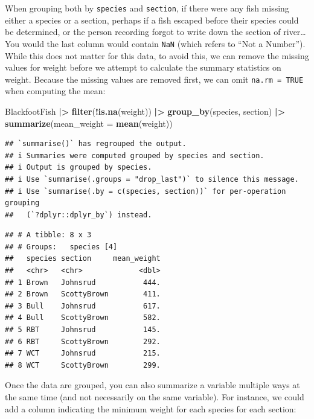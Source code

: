 \documentclass[
  10pt,
  letterpaper,
  twoside,
  openright]{book}
\newenvironment{Shaded}{\begin{snugshade}}{\end{snugshade}}
\newcommand{\AttributeTok}[1]{\textcolor[rgb]{0.13,0.29,0.53}{#1}}
\newcommand{\FunctionTok}[1]{\textcolor[rgb]{0.13,0.29,0.53}{\textbf{#1}}}
\newcommand{\NormalTok}[1]{#1}
\newcommand{\SpecialCharTok}[1]{\textcolor[rgb]{0.81,0.36,0.00}{\textbf{#1}}}
\begin{document}
When grouping both by \texttt{species} and \texttt{section}, if there
were any fish missing either a species or a section, perhaps if a fish
escaped before their species could be determined, or the person
recording forgot to write down the section of river\ldots{} You would
the last column would contain \texttt{NaN} (which refers to ``Not a
Number''). While this does not matter for this data, to avoid this, we
can remove the missing values for weight before we attempt to calculate
the summary statistics on weight. Because the missing values are removed
first, we can omit \texttt{na.rm\ =\ TRUE} when computing the mean:

\begin{Shaded}
\begin{Highlighting}[]
\NormalTok{BlackfootFish }\SpecialCharTok{|\textgreater{}}
  \FunctionTok{filter}\NormalTok{(}\SpecialCharTok{!}\FunctionTok{is.na}\NormalTok{(weight)) }\SpecialCharTok{|\textgreater{}}
  \FunctionTok{group\_by}\NormalTok{(species, section) }\SpecialCharTok{|\textgreater{}}
  \FunctionTok{summarize}\NormalTok{(}\AttributeTok{mean\_weight =} \FunctionTok{mean}\NormalTok{(weight))}
\end{Highlighting}
\end{Shaded}

\begin{verbatim}
## `summarise()` has regrouped the output.
## i Summaries were computed grouped by species and section.
## i Output is grouped by species.
## i Use `summarise(.groups = "drop_last")` to silence this message.
## i Use `summarise(.by = c(species, section))` for per-operation grouping
##   (`?dplyr::dplyr_by`) instead.
\end{verbatim}

\begin{verbatim}
## # A tibble: 8 x 3
## # Groups:   species [4]
##   species section     mean_weight
##   <chr>   <chr>             <dbl>
## 1 Brown   Johnsrud           444.
## 2 Brown   ScottyBrown        411.
## 3 Bull    Johnsrud           617.
## 4 Bull    ScottyBrown        582.
## 5 RBT     Johnsrud           145.
## 6 RBT     ScottyBrown        292.
## 7 WCT     Johnsrud           215.
## 8 WCT     ScottyBrown        299.
\end{verbatim}

Once the data are grouped, you can also summarize a variable multiple
ways at the same time (and not necessarily on the same variable). For
instance, we could add a column indicating the minimum weight for each
species for each section:
\end{document}
